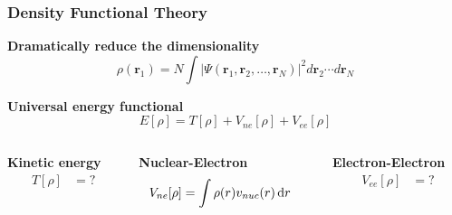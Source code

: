 \begin{frame}
    \frametitle{Density Functional Theory}
    \centering
    \textbf{Dramatically reduce the dimensionality}
    \begin{equation}
	\nonumber
	\rho(\boldsymbol{r}_1) = N \int |\Psi(\boldsymbol{r}_1, \boldsymbol{r}_2,\dots,
	\boldsymbol{r}_N)|^2 d\boldsymbol{r}_2\cdots d\boldsymbol{r}_N
    \end{equation}

    \vspace{8mm}

    \centering
    \textbf{Universal energy functional}
    \begin{equation}
	\nonumber
	E[\rho] = T[\rho] + V_{ne}[\rho] + V_{ee}[\rho]
    \end{equation}

    \vspace{10mm}

    \begin{columns}
    \begin{column}{.35\textwidth}
    \centering
    \textbf{Kinetic energy}
    \begin{align}
	\nonumber
	T[\rho]         &= ?
    \end{align}
    \end{column}
    \begin{column}{.30\textwidth}
    \centering
    \textbf{Nuclear-Electron}
    \begin{align}
	\nonumber
	V_{ne}[\rho]	&= \int \rho(r)v_{nuc}(r)\,\mathrm{d} r
    \end{align}
    \end{column}
    \begin{column}{.35\textwidth}
    \centering
    \textbf{Electron-Electron}
    \begin{align}
	\nonumber
	V_{ee}[\rho]    &= ?
    \end{align}
    \end{column}
    \end{columns}    
\end{frame}

